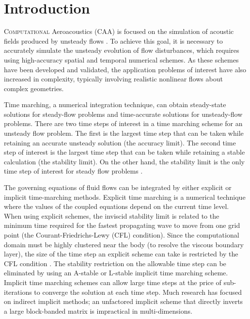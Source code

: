 \documentclass[conf]{new-aiaa}
\begin{document}
\section{Introduction}
\label{sec:Introdtion}
\lettrine{C}{omputational} Aeroacoustics (CAA) is focused on the simulation of acoustic fields produced by unsteady flows \cite{Tam_General, Lele, Tam_OverView, COLONIUS2004345}.  
To achieve this goal, it is necessary to accurately simulate the unsteady evolution of flow disturbances, which requires using high-accuracy spatial and temporal numerical schemes.
As these schemes have been developed and validated, the application problems of interest have also increased in complexity, typically involving realistic nonlinear flows about complex geometries.


Time marching, a numerical integration technique, can obtain steady-state solutions for steady-flow problems and time-accurate solutions for unsteady-flow problems.
There are two time steps of interest in a time marching scheme for an unsteady flow problem. 
The first is the largest time step that can be taken while retaining an accurate unsteady solution (the accuracy limit). 
The second time step of interest is the largest time step that can be taken while retaining a stable calculation (the stability limit).
On the other hand, the stability limit is the only time step of interest for steady flow problems \cite{Pulliamm}. 

The governing equations of fluid flows can be integrated by either explicit or implicit time-marching methods. 
Explicit time marching is a numerical technique where the values of the coupled equations depend on the current time level. 
When using explicit schemes, the inviscid stability limit is related to the minimum time required for the fastest propagating wave to move from one grid point (the Courant-Friedrichs-Lewy (CFL) condition). 
Since the computational domain must be highly clustered near the body (to resolve the viscous boundary layer), the size of the time step an explicit scheme can take is restricted by the CFL condition \cite{Maccormack, YoonLUSGS}.
The stability restriction on the allowable time step can be eliminated by using an A-stable or L-stable implicit time marching scheme.
Implicit time marching schemes can allow large time steps \cite{A_Stable} at the price of sub-iterations to converge the solution at each time step.
Much research has focused on indirect implicit methods; an unfactored implicit scheme that directly inverts a large block-banded matrix is impractical in multi-dimensions.
\end{document}
